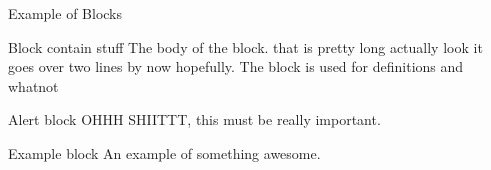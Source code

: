 \begin{frame}{Example of Blocks}
	\begin{block}{Block contain stuff}
		The body of the block. that is pretty long actually look it goes over two lines by now hopefully. The block is used for definitions and whatnot
	\end{block}
	\begin{alertblock}{Alert block}
		OHHH SHIITTT, this must be really important.
	\end{alertblock}
	\begin{exampleblock}{Example block}
		An example of something awesome.
	\end{exampleblock}
\end{frame}